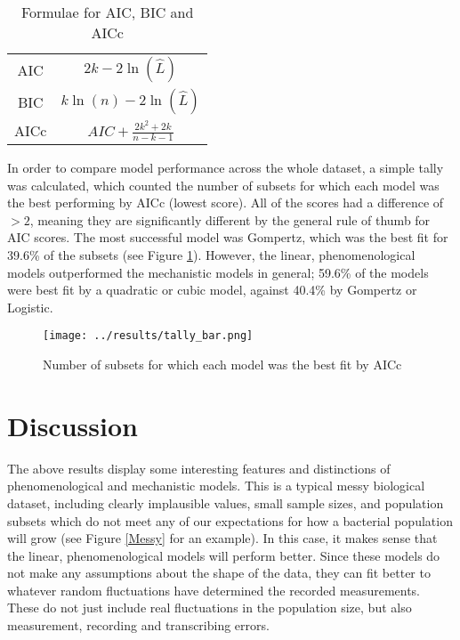 \documentclass[11pt,a4wide,titlepage]{article}
\begin{document}
\begin{table}
	\begin{center}
\caption{Formulae for AIC, BIC and AICc}\label{aic}
\def\arraystretch{1.5}
\begin{tabular}{|c|c|}
	\hline
	AIC & $2k - 2\ln(\hat{L})$\\
	BIC & $k\ln(n) - 2\ln(\hat{L})$\\
	AICc & $AIC + \frac{2k^2 + 2k}{n - k - 1}$\\
	\hline
\end{tabular}
\end{center}
\end{table}


In order to compare model performance across the whole dataset, a simple tally was calculated, which counted the number of subsets for which each model was the best performing by AICc (lowest score). All of the scores had a difference of $>2$, meaning they are significantly different by the general rule of thumb for AIC scores. The most successful model was Gompertz, which was the best fit for 39.6\% of the subsets (see Figure \ref{tally}). However, the linear, phenomenological models outperformed the mechanistic models in general; 59.6\% of the models were best fit by a quadratic or cubic model, against 40.4\% by Gompertz or Logistic.



\begin{figure}[H]
	\begin{center}
		\texttt{[image: ../results/tally\_bar.png]}\\
		\caption{Number of subsets for which each model was the best fit by AICc}\label{tally}
	\end{center}
	\end{figure}




\section*{Discussion}
The above results display some interesting features and distinctions of phenomenological and mechanistic models. This  is a typical messy biological dataset, including clearly implausible values, small sample sizes, and population subsets which do not meet any of our expectations for how a bacterial population will grow (see Figure \ref{Messy} for an example). In this case, it makes sense that the linear, phenomenological models will perform better. Since these models do not make any assumptions about the shape of the data, they can fit better to whatever random fluctuations have determined the recorded measurements. These do not just include real fluctuations in the population size, but also measurement, recording and transcribing errors. 
\end{document}
